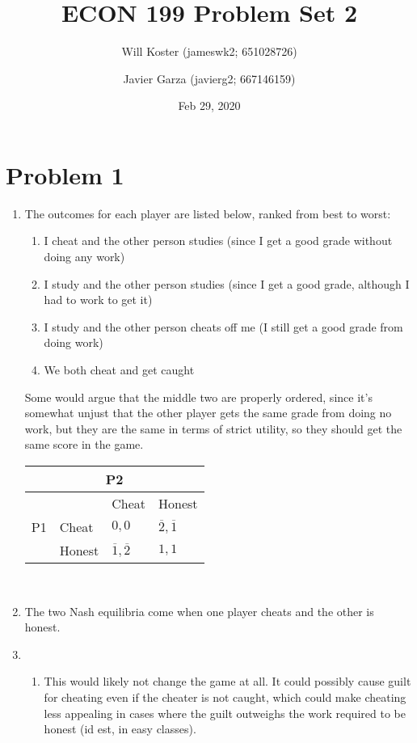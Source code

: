 \documentclass[letterpaper]{article}
\begin{document}
\title{ECON 199 Problem Set 2}
\author{Will Koster (jameswk2; 651028726) \and Javier Garza (javierg2; 667146159)}
\date{Feb 29, 2020}
\maketitle

\clearpage

\section{Problem 1}
\begin{enumerate}
    \item The outcomes for each player are listed below, ranked from best to worst:
        \begin{enumerate}
            \item I cheat and the other person studies (since I get a good grade without doing any work)
            \item I study and the other person studies (since I get a good grade, although I had to work to get it)
            \item I study and the other person cheats off me (I still get a good grade from doing work)
            \item We both cheat and get caught
        \end{enumerate}
        Some would argue that the middle two are properly ordered, since it's somewhat unjust that the other player gets the same grade from doing no work, but they are the same in terms of strict utility, so they should get the same score in the game. \\
\begin{tabular}{|l|l|l|l|}
\multicolumn{4}{c}{P2}                      \\ \hline
\multirow{3}{*}{P1} &   & Cheat        & Honest        \\ \hline
                       & Cheat & $0,0$ & $\overline2, \overline1$ \\ \hline
                       & Honest & $\overline1, \overline2$ & $1,1$ \\ \hline
\end{tabular} \\
\item The two Nash equilibria come when one player cheats and the other is honest.
\item \begin{enumerate}
        \item This would likely not change the game at all. It could possibly cause guilt for cheating even if the cheater is not caught, which could make cheating less appealing in cases where the guilt outweighs the work required to be honest (id est, in easy classes).

\end{enumerate}
\end{enumerate}
\end{document}
